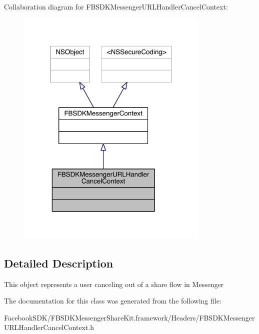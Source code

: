Collaboration diagram for F\-B\-S\-D\-K\-Messenger\-U\-R\-L\-Handler\-Cancel\-Context\-:
\nopagebreak
\begin{figure}[H]
\begin{center}
\leavevmode
\includegraphics[width=261pt]{interface_f_b_s_d_k_messenger_u_r_l_handler_cancel_context__coll__graph}
\end{center}
\end{figure}


\subsection{Detailed Description}
This object represents a user canceling out of a share flow in Messenger 

The documentation for this class was generated from the following file\-:\begin{DoxyCompactItemize}
\item 
Facebook\-S\-D\-K/\-F\-B\-S\-D\-K\-Messenger\-Share\-Kit.\-framework/\-Headers/F\-B\-S\-D\-K\-Messenger\-U\-R\-L\-Handler\-Cancel\-Context.\-h\end{DoxyCompactItemize}
